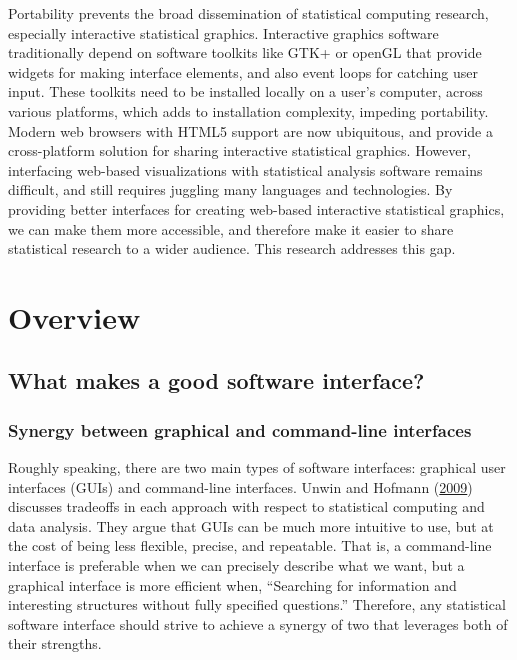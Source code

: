\documentclass[12pt,]{isuthesis}
\begin{document}
Portability prevents the broad dissemination of statistical computing
research, especially interactive statistical graphics. Interactive
graphics software traditionally depend on software toolkits like GTK+ or
openGL that provide widgets for making interface elements, and also
event loops for catching user input. These toolkits need to be installed
locally on a user's computer, across various platforms, which adds to
installation complexity, impeding portability. Modern web browsers with
HTML5 support are now ubiquitous, and provide a cross-platform solution
for sharing interactive statistical graphics. However, interfacing
web-based visualizations with statistical analysis software remains
difficult, and still requires juggling many languages and technologies.
By providing better interfaces for creating web-based interactive
statistical graphics, we can make them more accessible, and therefore
make it easier to share statistical research to a wider audience. This
research addresses this gap.

\chapter{Overview}

\section{What makes a good software
interface?}\label{what-makes-a-good-software-interface}

\subsection{Synergy between graphical and command-line
interfaces}\label{synergy-between-graphical-and-command-line-interfaces}

Roughly speaking, there are two main types of software interfaces:
graphical user interfaces (GUIs) and command-line interfaces. Unwin and
Hofmann (\protect\hyperlink{ref-Unwin:1999vp}{2009}) discusses tradeoffs
in each approach with respect to statistical computing and data
analysis. They argue that GUIs can be much more intuitive to use, but at
the cost of being less flexible, precise, and repeatable. That is, a
command-line interface is preferable when we can precisely describe what
we want, but a graphical interface is more efficient when, ``Searching
for information and interesting structures without fully specified
questions.'' Therefore, any statistical software interface should strive
to achieve a synergy of two that leverages both of their strengths.
\end{document}
